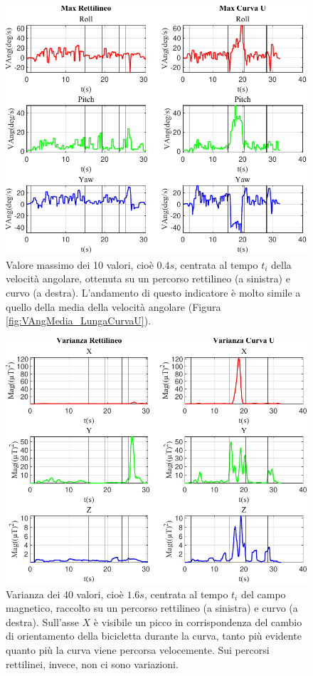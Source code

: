 \documentclass[class=article]{standalone}
\begin{document}
	\begin{center}
		\begin{figure}[h!]
			\centering\includegraphics[width=.7\textwidth]{img/LungaCurvaU/VAng/Max}
			\caption[]{Valore massimo dei 10 valori, cioè \(0.4s\), centrata al tempo \(t_{i}\) della velocità angolare, ottenuta su un percorso rettilineo (a sinistra) e curvo (a destra). L'andamento di questo indicatore è molto simile a quello della media della velocità angolare (Figura \ref{fig:VAngMedia_LungaCurvaU}).}
			\label{fig:VAngMax_LungaCurvaU}
		\end{figure}
	\end{center}

	\begin{center}
		\begin{figure}[h!]
			\centering\includegraphics[width=.7\textwidth]{img/LungaCurvaU/Mag/Varianza}
			\caption[]{Varianza dei 40 valori, cioè \(1.6s\), centrata al tempo \(t_{i}\) del campo magnetico, raccolto su un percorso rettilineo (a sinistra) e curvo (a destra). Sull'asse \(X\) è visibile un picco in corrispondenza del cambio di orientamento della bicicletta durante la curva, tanto più evidente quanto più la curva viene percorsa velocemente. Sui percorsi rettilinei, invece, non ci sono variazioni.}
			\label{fig:MagVar_LungaCurvaU}
		\end{figure}
	\end{center}
	
\end{document}
